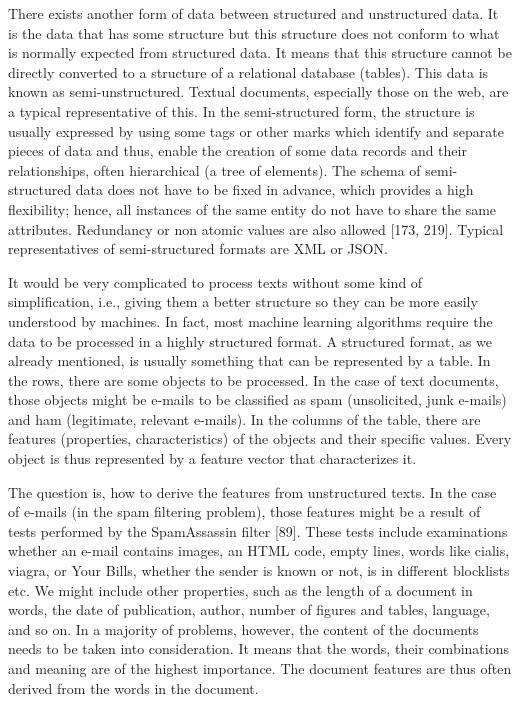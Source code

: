 \documentclass[10pt]{book}
\begin{document}
There exists another form of data between structured and unstructured data. It is the data that has some structure but this structure does not conform to what is normally expected from structured data. It means that this structure cannot be directly converted to a structure of a relational database (tables). This data is known as semi-unstructured. Textual documents, especially those on the web, are a typical representative of this. In the semi-structured form, the structure is usually expressed by using some tags or other marks which identify and separate pieces of data and thus, enable the creation of some data records and their relationships, often hierarchical (a tree of elements). The schema of semi-structured data does not have to be fixed in advance, which provides a high flexibility; hence, all instances of the same entity do not have to share the same attributes. Redundancy or non atomic values are also allowed [173, 219]. Typical representatives of semi-structured formats are XML or JSON.

It would be very complicated to process texts without some kind of simplification, i.e., giving them a better structure so they can be more easily understood by machines. In fact, most machine learning algorithms require the data to be processed in a highly structured format. A structured format, as we already mentioned, is usually something that can be represented by a table. In the rows, there are some objects to be processed. In the case of text documents, those objects might be e-mails to be classified as spam (unsolicited, junk e-mails) and ham (legitimate, relevant e-mails). In the columns of the table, there are features (properties, characteristics) of the objects and their specific values. Every object is thus represented by a feature vector that characterizes it.

The question is, how to derive the features from unstructured texts. In the case of e-mails (in the spam filtering problem), those features might be a result of tests performed by the SpamAssassin filter [89]. These tests include examinations whether an e-mail contains images, an HTML code, empty lines, words like cialis, viagra, or Your Bills, whether the sender is known or not, is in different blocklists etc. We might include other properties, such as the length of a document in words, the date of publication, author, number of figures and tables, language, and so on. In a majority of problems, however, the content of the documents needs to be taken into consideration. It means that the words, their combinations and meaning are of the highest importance. The document features are thus often derived from the words in the document.
\end{document}
